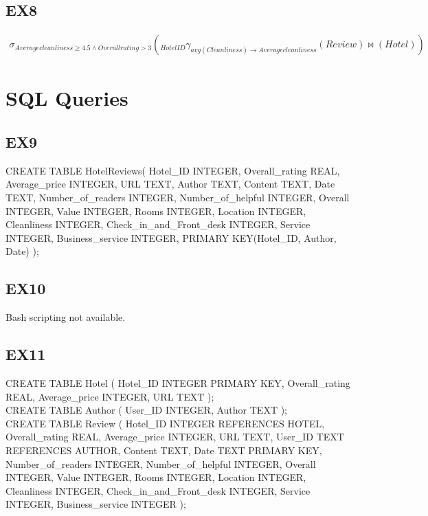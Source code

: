 \documentclass{article}
\begin{document}
	\subsection{EX8}
	\begin{eqnarray}
	\sigma _{Average cleanliness \geq 4.5 \wedge Overall rating > 3}(_{Hotel ID} \gamma _{avg(Cleanliness) \rightarrow Average cleanliness}(Review) \bowtie (Hotel))
	\end{eqnarray}
	
	\section{SQL Queries}
	
	\subsection{EX9}
	CREATE TABLE HotelReviews(
	Hotel\_ID INTEGER, 
	Overall\_rating REAL, 
	Average\_price INTEGER, 
	URL TEXT, 
	Author TEXT, 
	Content TEXT, 
	Date TEXT, 
	Number\_of\_readers INTEGER, 
	Number\_of\_helpful INTEGER, 
	Overall INTEGER, 
	Value INTEGER, 
	Rooms INTEGER, 
	Location INTEGER,
	Cleanliness INTEGER, 
	Check\_in\_and\_Front\_desk INTEGER, 
	Service INTEGER, 
	Business\_service INTEGER, 
	PRIMARY KEY(Hotel\_ID, Author, Date) 
	);
	
	
	\subsection{EX10}
	Bash scripting not available.
	
	\subsection{EX11}
	CREATE TABLE Hotel (
	Hotel\_ID INTEGER PRIMARY KEY,
	Overall\_rating REAL,
	Average\_price INTEGER,
	URL TEXT
	); \\
	
	CREATE TABLE Author (
	User\_ID INTEGER,
	Author TEXT
	); \\
	
	CREATE TABLE Review (
	Hotel\_ID INTEGER REFERENCES HOTEL,
	Overall\_rating REAL,
	Average\_price INTEGER,
	URL TEXT,
	User\_ID TEXT REFERENCES AUTHOR,
	Content TEXT,
	Date TEXT PRIMARY KEY,
	Number\_of\_readers INTEGER,
	Number\_of\_helpful INTEGER,
	Overall INTEGER,
	Value INTEGER,
	Rooms INTEGER,
	Location INTEGER,
	Cleanliness INTEGER,
	Check\_in\_and\_Front\_desk INTEGER,
	Service INTEGER,
	Business\_service INTEGER
	);
	
\end{document}
